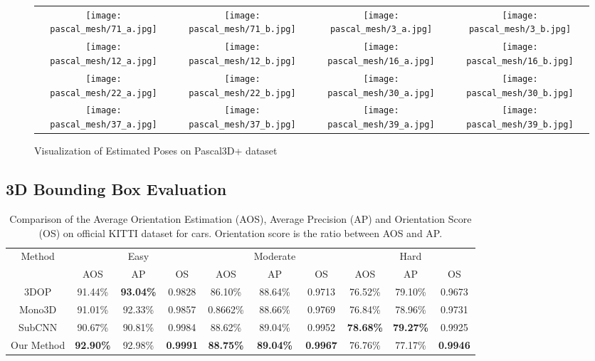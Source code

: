 \documentclass[10pt,twocolumn,letterpaper]{article}
\begin{document}
\begin{figure}
\begin{tabular}{c@{\hspace{1mm}}c@{\hspace{1mm}}c@{\hspace{1mm}}c}
\texttt{[image: pascal\_mesh/71\_a.jpg]}&
\texttt{[image: pascal\_mesh/71\_b.jpg]}&
\texttt{[image: pascal\_mesh/3\_a.jpg]}&
\texttt{[image: pascal\_mesh/3\_b.jpg]}\\
\texttt{[image: pascal\_mesh/12\_a.jpg]}&
\texttt{[image: pascal\_mesh/12\_b.jpg]}&
\texttt{[image: pascal\_mesh/16\_a.jpg]}&
\texttt{[image: pascal\_mesh/16\_b.jpg]}\\

\texttt{[image: pascal\_mesh/22\_a.jpg]}&
\texttt{[image: pascal\_mesh/22\_b.jpg]}&
\texttt{[image: pascal\_mesh/30\_a.jpg]}&
\texttt{[image: pascal\_mesh/30\_b.jpg]}\\
\texttt{[image: pascal\_mesh/37\_a.jpg]}&
\texttt{[image: pascal\_mesh/37\_b.jpg]}&
\texttt{[image: pascal\_mesh/39\_a.jpg]}&
\texttt{[image: pascal\_mesh/39\_b.jpg]}\\

\end{tabular}
\caption{Visualization of Estimated Poses on Pascal3D+ dataset}
\label{fig:pascal_mesh}
\end{figure}
\fi


\subsection{3D Bounding Box Evaluation}
\begin{table*}
\centering
\begin{tabular}{|c||ccc|ccc|ccc|}
\hline
Method & & Easy & & & Moderate & & & Hard & \\
& AOS & AP & OS & AOS & AP & OS & AOS & AP & OS\\
\hline
3DOP\cite{3DOPNIPS15} & 91.44\% & {\bf 93.04\%} & 0.9828&  86.10\% & 88.64\% & 0.9713 & 76.52\% & 79.10\% &  0.9673\\
Mono3D\cite{ChenUrtasunCVPR16} & 91.01\% & 92.33\% & 0.9857 & 0.8662\% & 88.66\% & 0.9769 & 76.84\% & 78.96\% & 0.9731 \\
SubCNN\cite{xiang2016subcategory} & 90.67\% & 90.81\%& 0.9984 & 88.62\% & 89.04\%& 0.9952  &  {\bf 78.68\%} & {\bf 79.27\%} & 0.9925 \\
Our Method &  {\bf 92.90\%} & 92.98\% & {\bf 0.9991} & {\bf 88.75\%} & {\bf 89.04\%} & {\bf 0.9967} &  76.76\% & 77.17\% & {\bf 0.9946} \\
\hline
\end{tabular}
\caption{Comparison of the Average Orientation Estimation (AOS), Average Precision (AP) and Orientation Score (OS) on official KITTI dataset for cars. Orientation score is the ratio between AOS and AP.}
\label{tab:kitti_car}
\end{table*}
\end{document}
